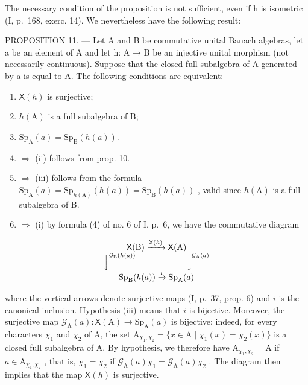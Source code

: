 The necessary condition of the proposition is not sufficient, even if h is isometric (I, p.~168, exerc. 14). We nevertheless have the following result:

PROPOSITION 11. --- Let A and B be commutative unital Banach algebras, let a be an element of A and let h: A → B be an injective unital morphism (not necessarily continuous). Suppose that the closed full subalgebra of A generated by a is equal to A. The following conditions are equivalent:

\begin{enumerate}
\def\labelenumi{(\roman{enumi})}
\item
  \(\mathsf{X}(h)\) is surjective;
\item
  \(h(\mathrm{A})\) is a full subalgebra of B;
\item
  \(\mathrm{Sp}_{\mathrm{A}}(a)=\mathrm{Sp}_{\mathrm{B}}(h(a)).\)
\item
  \(\Longrightarrow\) (ii) follows from prop. 10.
\item
  \(\Longrightarrow\) (iii) follows from the formula \(\mathrm{Sp}_{\mathrm{A}}(a) = \mathrm{Sp}_{h(\mathrm{A})}(h(a)) = \mathrm{Sp}_{\mathrm{B}}(h(a))\) , valid since \(h(\mathrm{A})\) is a full subalgebra of B.
\item
  \(\Longrightarrow\) (i) by formula (4) of no. 6 of I, p.~6, we have the commutative diagram
\end{enumerate}

\[
\begin{array}{c} \mathsf {X} (\mathrm{B}) \xrightarrow {\mathsf {X} (h)} \mathsf {X} (\mathrm{A}) \\ \Big \downarrow^ {\mathcal {G} _ {\mathrm{B}} (h (a))} \qquad \qquad \qquad \Big \downarrow^ {\mathcal {G} _ {\mathrm{A}} (a)} \\ \operatorname{Sp} _ {\mathrm{B}} (h (a)) \xrightarrow {i} \operatorname{Sp} _ {\mathrm{A}} (a) \end{array}
\]

where the vertical arrows denote surjective maps (I, p.~37, prop. 6) and \(i\) is the canonical inclusion. Hypothesis (iii) means that \(i\) is bijective. Moreover, the surjective map \(\mathcal{G}_{\mathrm{A}}(a)\colon \mathsf{X}(\mathrm{A})\to \mathrm{Sp}_{\mathrm{A}}(a)\) is bijective: indeed, for every characters \(\chi_{1}\) and \(\chi_{2}\) of A, the set \(\mathrm{A}_{\chi_1,\chi_2} = \{x\in \mathrm{A}\mid \chi_1(x) = \chi_2(x)\}\) is a closed full subalgebra of A. By hypothesis, we therefore have \(\mathrm{A}_{\chi_1,\chi_2} = \mathrm{A}\) if \(a\in \mathrm{A}_{\chi_1,\chi_2}\) , that is, \(\chi_{1} = \chi_{2}\) if \(\mathcal{G}_{\mathrm{A}}(a)\chi_{1} = \mathcal{G}_{\mathrm{A}}(a)\chi_{2}\) . The diagram then implies that the map \(\mathsf{X}(h)\) is surjective.

